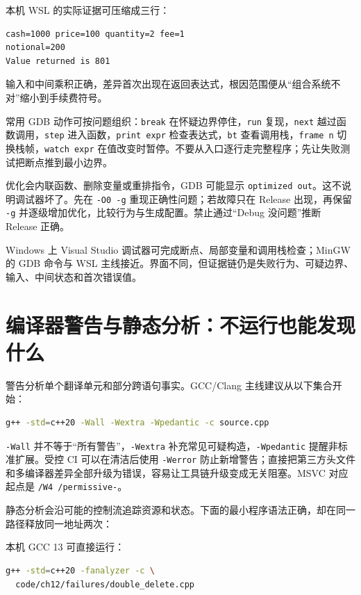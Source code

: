 本机 WSL 的实际证据可压缩成三行：

\begin{lstlisting}[numbers=none]
cash=1000 price=100 quantity=2 fee=1
notional=200
Value returned is 801
\end{lstlisting}

输入和中间乘积正确，差异首次出现在返回表达式，根因范围便从“组合系统不对”缩小到手续费符号。

常用 GDB 动作可按问题组织：\texttt{break} 在怀疑边界停住，\texttt{run} 复现，\texttt{next} 越过函数调用，\texttt{step} 进入函数，\texttt{print expr} 检查表达式，\texttt{bt} 查看调用栈，\texttt{frame n} 切换栈帧，\texttt{watch expr} 在值改变时暂停。不要从入口逐行走完整程序；先让失败测试把断点推到最小边界。

优化会内联函数、删除变量或重排指令，GDB 可能显示 \texttt{optimized out}。这不说明调试器坏了。先在 \texttt{-O0 -g} 重现正确性问题；若故障只在 Release 出现，再保留 \texttt{-g} 并逐级增加优化，比较行为与生成配置。禁止通过“Debug 没问题”推断 Release 正确。

Windows 上 Visual Studio 调试器可完成断点、局部变量和调用栈检查；MinGW 的 GDB 命令与 WSL 主线接近。界面不同，但证据链仍是失败行为、可疑边界、输入、中间状态和首次错误值。

\section{编译器警告与静态分析：不运行也能发现什么}

警告分析单个翻译单元和部分跨语句事实。GCC/Clang 主线建议从以下集合开始：

\begin{lstlisting}[language=bash,numbers=none]
g++ -std=c++20 -Wall -Wextra -Wpedantic -c source.cpp
\end{lstlisting}

\texttt{-Wall} 并不等于“所有警告”，\texttt{-Wextra} 补充常见可疑构造，\texttt{-Wpedantic} 提醒非标准扩展。受控 CI 可以在清洁后使用 \texttt{-Werror} 防止新增警告；直接把第三方头文件和多编译器差异全部升级为错误，容易让工具链升级变成无关阻塞。MSVC 对应起点是 \texttt{/W4 /permissive-}。

静态分析会沿可能的控制流追踪资源和状态。下面的最小程序语法正确，却在同一路径释放同一地址两次：



本机 GCC 13 可直接运行：

\begin{lstlisting}[language=bash,numbers=none]
g++ -std=c++20 -fanalyzer -c \
  code/ch12/failures/double_delete.cpp
\end{lstlisting}

